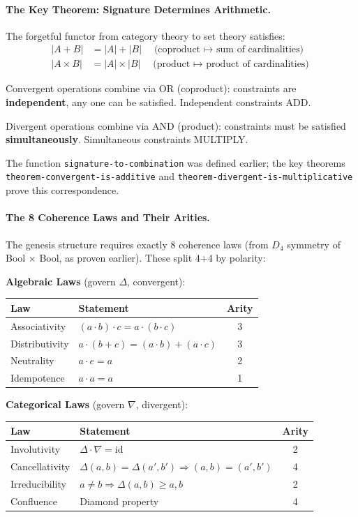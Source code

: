 \documentclass[11pt,a4paper]{book}
\begin{document}
\paragraph{The Key Theorem: Signature Determines Arithmetic.}

The forgetful functor from category theory to set theory satisfies:
\begin{align*}
|A + B| &= |A| + |B| \quad \text{(coproduct $\mapsto$ sum of cardinalities)} \\
|A \times B| &= |A| \times |B| \quad \text{(product $\mapsto$ product of cardinalities)}
\end{align*}

Convergent operations combine via OR (coproduct): constraints are 
\textbf{independent}, any one can be satisfied. Independent constraints ADD.

Divergent operations combine via AND (product): constraints must be 
satisfied \textbf{simultaneously}. Simultaneous constraints MULTIPLY.

The function \verb|signature-to-combination| was defined earlier; the key 
theorems \verb|theorem-convergent-is-additive| and 
\verb|theorem-divergent-is-multiplicative| prove this correspondence.

\paragraph{The 8 Coherence Laws and Their Arities.}

The genesis structure requires exactly 8 coherence laws (from $D_4$ symmetry 
of Bool $\times$ Bool, as proven earlier). These split 4+4 by polarity:

\textbf{Algebraic Laws} (govern $\Delta$, convergent):
\begin{center}
\begin{tabular}{llc}
Law & Statement & Arity \\
\hline
Associativity & $(a \cdot b) \cdot c = a \cdot (b \cdot c)$ & 3 \\
Distributivity & $a \cdot (b + c) = (a \cdot b) + (a \cdot c)$ & 3 \\
Neutrality & $a \cdot e = a$ & 2 \\
Idempotence & $a \cdot a = a$ & 1 \\
\end{tabular}
\end{center}

\textbf{Categorical Laws} (govern $\nabla$, divergent):
\begin{center}
\begin{tabular}{llc}
Law & Statement & Arity \\
\hline
Involutivity & $\Delta \cdot \nabla = \text{id}$ & 2 \\
Cancellativity & $\Delta(a,b) = \Delta(a',b') \Rightarrow (a,b) = (a',b')$ & 4 \\
Irreducibility & $a \neq b \Rightarrow \Delta(a,b) \geq a, b$ & 2 \\
Confluence & Diamond property & 4 \\
\end{tabular}
\end{center}
\end{document}
